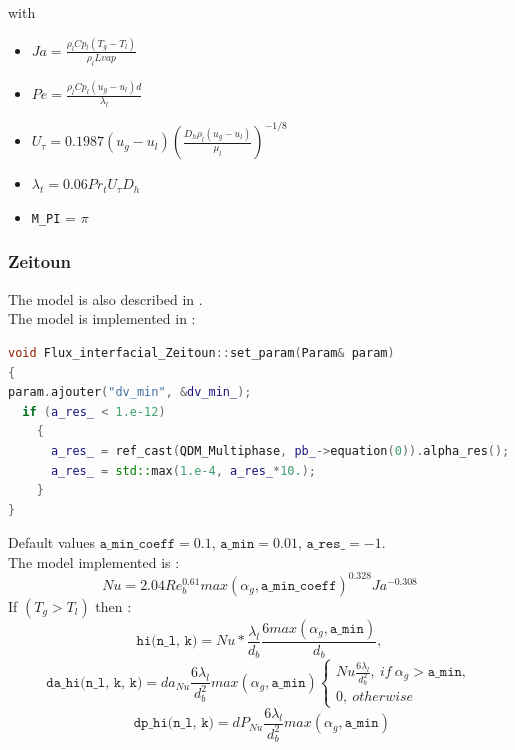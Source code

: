 with
\begin{itemize}
    \item[\small \textcolor{blue}{\ding{109}}]$Ja=\frac{\rho_l Cp_l (T_g-T_l)}{\rho_lLvap}$
    \item[\small \textcolor{blue}{\ding{109}}]$Pe=\frac{\rho_l Cp_l (u_g-u_l)d}{\lambda_l}$
    \item[\small \textcolor{blue}{\ding{109}}]$U_\tau = 0.1987 (u_g-u_l) (\frac{D_h\rho_l (u_g-u_l)}{\mu_l})^{-1/8}$
    \item[\small \textcolor{blue}{\ding{109}}]$\lambda_t = 0.06Pr_t  U_\tau D_h $
    \item[\small \textcolor{blue}{\ding{109}}]\texttt{M\_PI} = $\pi$
\end{itemize}

\subsubsection{Zeitoun}
The model is also described in \cite{}.\\
The model is implemented in :
\begin{lstlisting}[language=c++]
void Flux_interfacial_Zeitoun::set_param(Param& param)
{
param.ajouter("dv_min", &dv_min_);
  if (a_res_ < 1.e-12)
    {
      a_res_ = ref_cast(QDM_Multiphase, pb_->equation(0)).alpha_res();
      a_res_ = std::max(1.e-4, a_res_*10.);
    }
}
\end{lstlisting}
Default values $\texttt{a\_min\_coeff} = 0.1$, $\texttt{a\_min} = 0.01$, $\texttt{a\_res\_} = -1.$\\
The model implemented is :
\begin{equation}
  Nu = 2.04Re_b^{0.61}max(\alpha_g, \texttt{a\_min\_coeff})^{0.328} Ja^{-0.308}
\end{equation}
If $( T_g >  T_l)$ then :
\begin{equation}
    \texttt{hi(n_l, k)} = Nu *\frac{\lambda_l}{d_b} \frac{6max(\alpha_g,\texttt{a\_min})}{d_b},
\end{equation}
\begin{equation}
\texttt{da\_ hi(n_l, k, k)} = da_{Nu} \frac{6\lambda_l}{d_b^2}max(\alpha_g,\texttt{a\_min}) \begin{cases}
    Nu \frac{6\lambda_l}{d_b^2},\ if\ \alpha_g> \texttt{a\_ min},\\ 0,\ otherwise
\end{cases}
\end{equation}
\begin{equation}
\texttt{ dp\_hi(n_l, k)}    = dP_{Nu} \frac{6\lambda_l}{d_b^2}max(\alpha_g,\texttt{a\_min})
\end{equation}

